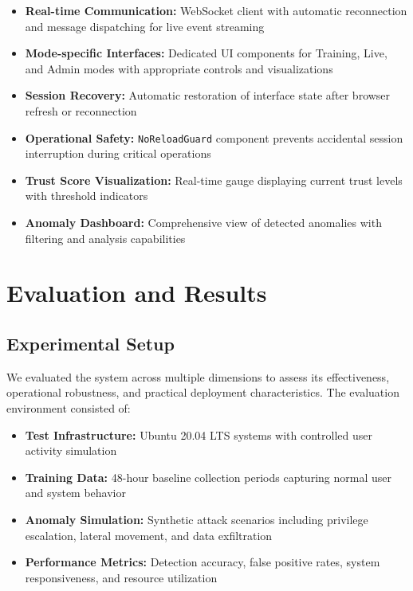 \documentclass[conference]{IEEEtran}
\begin{document}
\begin{itemize}[leftmargin=*]
  \item \textbf{Real-time Communication:} WebSocket client with automatic reconnection and message dispatching for live event streaming
  \item \textbf{Mode-specific Interfaces:} Dedicated UI components for Training, Live, and Admin modes with appropriate controls and visualizations
  \item \textbf{Session Recovery:} Automatic restoration of interface state after browser refresh or reconnection
  \item \textbf{Operational Safety:} \texttt{NoReloadGuard} component prevents accidental session interruption during critical operations
  \item \textbf{Trust Score Visualization:} Real-time gauge displaying current trust levels with threshold indicators
  \item \textbf{Anomaly Dashboard:} Comprehensive view of detected anomalies with filtering and analysis capabilities
\end{itemize}

\section{Evaluation and Results}

\subsection{Experimental Setup}
We evaluated the system across multiple dimensions to assess its effectiveness, operational robustness, and practical deployment characteristics. The evaluation environment consisted of:

\begin{itemize}[leftmargin=*]
  \item \textbf{Test Infrastructure:} Ubuntu 20.04 LTS systems with controlled user activity simulation
  \item \textbf{Training Data:} 48-hour baseline collection periods capturing normal user and system behavior
  \item \textbf{Anomaly Simulation:} Synthetic attack scenarios including privilege escalation, lateral movement, and data exfiltration
  \item \textbf{Performance Metrics:} Detection accuracy, false positive rates, system responsiveness, and resource utilization
\end{itemize}
\end{document}
